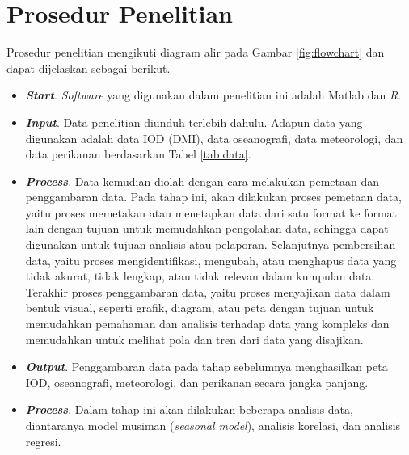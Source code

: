 \section[Prosedur Penelitian]{Prosedur Penelitian}
\begin{spacing}{1.5}
	Prosedur penelitian mengikuti diagram alir pada Gambar \ref{fig:flowchart} dan dapat dijelaskan sebagai berikut. 
	\begin{itemize}
		\item \textbf{\textit{Start}}. \textit{Software} yang digunakan dalam penelitian ini adalah Matlab dan \textit{R}.
		\item \textbf{\textit{Input}}. Data penelitian diunduh terlebih dahulu. Adapun data yang digunakan adalah data IOD (DMI), data oseanografi, data meteorologi, dan data perikanan berdasarkan Tabel \ref{tab:data}.
		\item \textbf{\textit{Process}}. Data kemudian diolah dengan cara melakukan pemetaan dan penggambaran data. Pada tahap ini, akan dilakukan proses pemetaan data, yaitu proses memetakan atau menetapkan data dari satu format ke format lain dengan tujuan untuk memudahkan pengolahan data, sehingga dapat digunakan untuk tujuan analisis atau pelaporan. Selanjutnya pembersihan data, yaitu proses mengidentifikasi, mengubah, atau menghapus data yang tidak akurat, tidak lengkap, atau tidak relevan dalam kumpulan data. Terakhir proses penggambaran data, yaitu proses menyajikan data dalam bentuk visual, seperti grafik, diagram, atau peta dengan tujuan untuk memudahkan pemahaman dan analisis terhadap data yang kompleks dan memudahkan untuk melihat pola dan tren dari data yang disajikan.
		
		\item \textbf{\textit{Output}}. Penggambaran data pada tahap sebelumnya menghasilkan peta IOD, oseanografi, meteorologi, dan perikanan secara jangka panjang. 
		\item \textbf{\textit{Process}}. Dalam tahap ini akan dilakukan beberapa analisis data, diantaranya model musiman (\textit{seasonal model}), analisis korelasi, dan analisis regresi.
		
		

\end{itemize}
\end{spacing}
